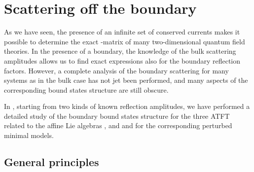 \documentclass[a4paper,12pt]{report}
\begin{document}
\chapter{Scattering off the boundary}

As we have seen, the presence of an infinite set of conserved currents makes it possible to determine the exact
\coordHE{}-matrix of many two-dimensional quantum field theories. In the presence of a boundary, the knowledge of the
bulk scattering amplitudes allows us to find exact expressions also for the boundary reflection factors. However,
a complete analysis of the boundary scattering for many systems as in the bulk case has not jet been performed,
and many aspects of the corresponding bound states structure are still obscure.

In \cite{io}, starting from two kinds of known reflection amplitudes, we have performed a detailed study of the
boundary bound states structure for the three ATFT related to the affine Lie algebras \coordHE{}, \coordHE{} and
\coordHE{} and for the corresponding perturbed minimal models.

\vspace{1cm}

\section{General principles}
\end{document}
